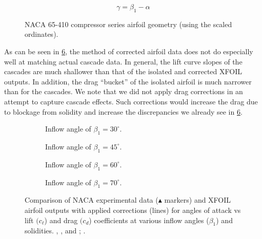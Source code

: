 \begin{equation}
    \gamma = \beta_1 - \alpha
\end{equation}

\begin{figure}[hb!]
    \centering
        \caption{NACA 65-410 compressor series airfoil geometry (using the scaled ordinates).}
    \label{fig:naca65410scaled}
\end{figure}


As can be seen in \cref{fig:naca65410comps}, the method of corrected airfoil data does not do especially well at matching actual cascade data.
%
In general, the lift curve slopes of the cascades are much shallower than that of the isolated and corrected XFOIL outputs.
%
In addition, the drag ``bucket'' of the isolated airfoil is much narrower than for the cascades.
%
We note that we did not apply drag corrections in an attempt to capture cascade effects.
%
Such corrections would increase the drag due to blockage from solidity and increase the discrepancies we already see in \cref{fig:naca65410comps}.

\clearpage
\newpage

\begin{figure}[h!]
     \centering
     \begin{subfigure}[t]{\textwidth}
         \centering
         \caption{Inflow angle of \(\beta_1=30^\circ\).}
         \label{}
     \end{subfigure}

     \begin{subfigure}[t]{\textwidth}
         \centering
         \caption{Inflow angle of \(\beta_1=45^\circ\).}
         \label{}
     \end{subfigure}

     \begin{subfigure}[t]{\textwidth}
         \centering
         \caption{Inflow angle of \(\beta_1=60^\circ\).}
         \label{}
     \end{subfigure}

     \begin{subfigure}[t]{\textwidth}
         \centering
         \raisebox{-4em}{}%
         \caption{Inflow angle of \(\beta_1=70^\circ\).}
         \label{}
     \end{subfigure}

     \caption{Comparison of NACA experimental data (\(\blacktriangle\) markers) and XFOIL airfoil outputs with applied corrections (lines) for angles of attack vs lift \((c_\ell\)) and drag \((c_d\)) coefficients at various inflow angles (\(\beta_1\)) and solidities. , , and ; .}
     \label{fig:naca65410comps}
\end{figure}

\clearpage
\newpage
